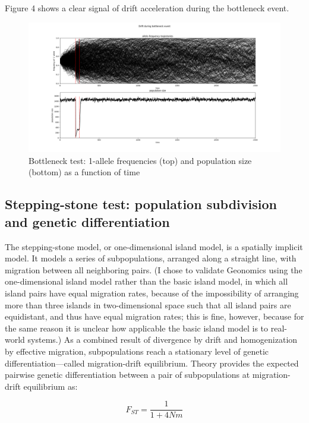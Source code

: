﻿\documentclass{article}
\begin{document}
Figure 4 shows a clear signal of drift acceleration during the bottleneck event.

\begin{figure}[h!]
\includegraphics[width=175mm]{./img/validation/bottleneck/alleles_seem_to_take_too_long_to_fix.png}
        \caption{Bottleneck test: 1-allele frequencies (top) and population size (bottom) as a function of time}
\end{figure}


\subsection{Stepping-stone test: population subdivision and genetic differentiation}
The stepping-stone model, or one-dimensional island model, is a spatially implicit model.
It models a series of subpopulations, arranged along a straight line,
with migration between all neighboring pairs. (I chose to validate Geonomics using
the one-dimensional island model rather than the basic island model, in which all
island pairs have equal migration rates, because of the impossibility of arranging
more than three islands in two-dimensional space such that all island pairs are
equidistant, and thus have equal migration rates; this is fine, however, because for
the same reason it is unclear how applicable the basic island model is to real-world
systems.) As a combined result of divergence by drift and homogenization
by effective migration, subpopulations reach a stationary level 
of genetic differentiation---called migration-drift equilibrium. 
Theory provides the expected pairwise genetic differentiation
between a pair of subpopulations at migration-drift equilibrium
as:

\begin{equation}
F_{ST} = \frac{1}{1 + 4Nm}
\end{equation}
\end{document}
